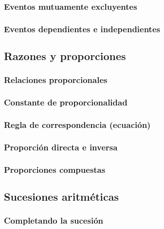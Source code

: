 \documentclass[12pt,addpoints,answers]{evalua}
\begin{document}
\begin{questions}
	\subsubsection{Eventos mutuamente excluyentes}
	\question[1]{}
	\subsubsection{Eventos dependientes e independientes}
	\question[1]{}
	\subsection   {Razones y proporciones}
	\subsubsection{Relaciones proporcionales}
	\question[1]{}
	\subsubsection{Constante de proporcionalidad}
	\question[1]{}
	\subsubsection{Regla de correspondencia (ecuación)}
	\question[1]{}
	\subsubsection{Proporción directa e inversa}
	\question[1]{}
	\subsubsection{Proporciones compuestas}
	\question[1]{}
	\subsection   {Sucesiones aritméticas}
	\subsubsection{Completando la sucesión}
	\question[1]{}

\end{questions}
\end{document}

